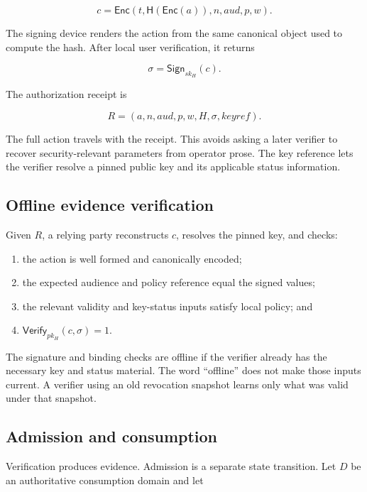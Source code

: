 \documentclass[10.5pt]{article}
\newcommand{\Enc}{\mathsf{Enc}}
\newcommand{\Hash}{\mathsf{H}}
\newcommand{\Sign}{\mathsf{Sign}}
\newcommand{\Verify}{\mathsf{Verify}}
\begin{document}
\begin{equation}
  c = \Enc(t,\Hash(\Enc(a)),n,aud,p,w).
\end{equation}

The signing device renders the action from the same canonical object used to
compute the hash. After local user verification, it returns

\begin{equation}
  \sigma = \Sign_{sk_H}(c).
\end{equation}

The authorization receipt is

\begin{equation}
  R = (a,n,aud,p,w,H,\sigma,\mathit{keyref}).
\end{equation}

The full action travels with the receipt. This avoids asking a later verifier to
recover security-relevant parameters from operator prose. The key reference lets
the verifier resolve a pinned public key and its applicable status information.

\subsection{Offline evidence verification}

Given $R$, a relying party reconstructs $c$, resolves the pinned key, and checks:

\begin{enumerate}[leftmargin=*]
\item the action is well formed and canonically encoded;
\item the expected audience and policy reference equal the signed values;
\item the relevant validity and key-status inputs satisfy local policy; and
\item $\Verify_{pk_H}(c,\sigma)=1$.
\end{enumerate}

The signature and binding checks are offline if the verifier already has the
necessary key and status material. The word ``offline'' does not make those
inputs current. A verifier using an old revocation snapshot learns only what was
valid under that snapshot.

\subsection{Admission and consumption}

Verification produces evidence. Admission is a separate state transition. Let
$D$ be an authoritative consumption domain and let
\end{document}
